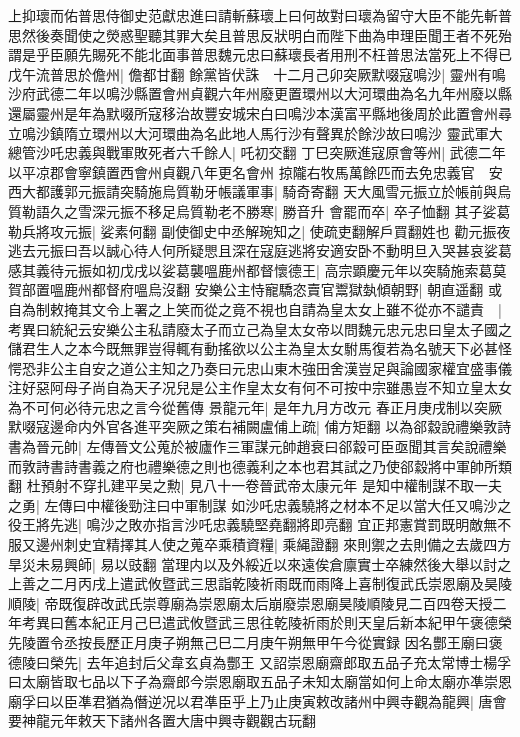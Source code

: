 上抑瓌而佑普思侍御史范獻忠進曰請斬蘇瓌上曰何故對曰瓌為留守大臣不能先斬普思然後奏聞使之熒惑聖聽其罪大矣且普思反狀明白而陛下曲為申理臣聞王者不死殆謂是乎臣願先賜死不能北面事普思魏元忠曰蘇瓌長者用刑不枉普思法當死上不得已戊午流普思於儋州|{
	儋都甘翻}
餘黨皆伏誅　十二月己卯突厥默啜寇鳴沙|{
	靈州有鳴沙府武德二年以鳴沙縣置會州貞觀六年州廢更置環州以大河環曲為名九年州廢以縣還屬靈州是年為默啜所寇移治故豐安城宋白曰鳴沙本漢富平縣地後周於此置會州尋立鳴沙鎮隋立環州以大河環曲為名此地人馬行沙有聲異於餘沙故曰鳴沙}
靈武軍大總管沙吒忠義與戰軍敗死者六千餘人|{
	吒初交翻}
丁巳突厥進寇原會等州|{
	武德二年以平凉郡會寧鎮置西會州貞觀八年更名會州}
掠隴右牧馬萬餘匹而去免忠義官　安西大都護郭元振請突騎施烏質勒牙帳議軍事|{
	騎奇寄翻}
天大風雪元振立於帳前與烏質勒語久之雪深元振不移足烏質勒老不勝寒|{
	勝音升}
會罷而卒|{
	卒子恤翻}
其子娑葛勒兵將攻元振|{
	娑素何翻}
副使御史中丞解琬知之|{
	使疏吏翻解戶買翻姓也}
勸元振夜逃去元振曰吾以誠心待人何所疑愳且深在寇庭逃將安適安卧不動明旦入哭甚哀娑葛感其義待元振如初戊戌以娑葛襲嗢鹿州都督懷德王|{
	高宗顕慶元年以突騎施索葛莫賀部置嗢鹿州都督府嗢烏沒翻}
安樂公主恃寵驕恣賣官鬻獄埶傾朝野|{
	朝直遥翻}
或自為制敕掩其文令上署之上笑而從之竟不視也自請為皇太女上雖不從亦不譴責　|{
	考異曰統紀云安樂公主私請廢太子而立己為皇太女帝以問魏元忠元忠曰皇太子國之儲君生人之本今既無罪豈得輒有動搖欲以公主為皇太女駙馬復若為名號天下必甚怪愕恐非公主自安之道公主知之乃奏曰元忠山東木強田舍漢豈足與論國家權宜盛事儀注好惡阿母子尚自為天子况兒是公主作皇太女有何不可按中宗雖愚豈不知立皇太女為不可何必待元忠之言今從舊傳}
景龍元年|{
	是年九月方改元}
春正月庚戌制以突厥默啜寇邊命内外官各進平突厥之策右補闕盧俌上疏|{
	俌方矩翻}
以為郤縠說禮樂敦詩書為晉元帥|{
	左傳晉文公蒐於被廬作三軍謀元帥趙衰曰郤縠可臣亟聞其言矣說禮樂而敦詩書詩書義之府也禮樂德之則也德義利之本也君其試之乃使郤縠將中軍帥所類翻}
杜預射不穿扎建平吴之勲|{
	見八十一卷晉武帝太康元年}
是知中權制謀不取一夫之勇|{
	左傳曰中權後勁注曰中軍制謀}
如沙吒忠義驍將之材本不足以當大任又鳴沙之役王將先逃|{
	鳴沙之敗亦指言沙吒忠義驍堅堯翻將即亮翻}
宜正邦憲賞罰既明敵無不服又邊州刺史宜精擇其人使之蒐卒乘積資糧|{
	乘䋲證翻}
來則禦之去則備之去歲四方旱災未易興師|{
	易以豉翻}
當理内以及外綏近以來遠俟倉廪實士卒練然後大舉以討之上善之二月丙戌上遣武攸暨武三思詣乾陵祈雨既而雨降上喜制復武氏崇恩廟及昊陵順陵|{
	帝既復辟改武氏崇尊廟為崇恩廟太后崩廢崇恩廟昊陵順陵見二百四卷天授二年考異曰舊本紀正月己巳遣武攸暨武三思往乾陵祈雨於則天皇后新本紀甲午褒德榮先陵置令丞按長歷正月庚子朔無己巳二月庚午朔無甲午今從實録}
因名酆王廟曰褒德陵曰榮先|{
	去年追封后父韋玄貞為酆王}
又詔崇恩廟齋郎取五品子充太常博士楊孚曰太廟皆取七品以下子為齋郎今崇恩廟取五品子未知太廟當如何上命太廟亦凖崇恩廟孚曰以臣凖君猶為僭逆况以君凖臣乎上乃止庚寅敕改諸州中興寺觀為龍興|{
	唐會要神龍元年敕天下諸州各置大唐中興寺觀觀古玩翻}
